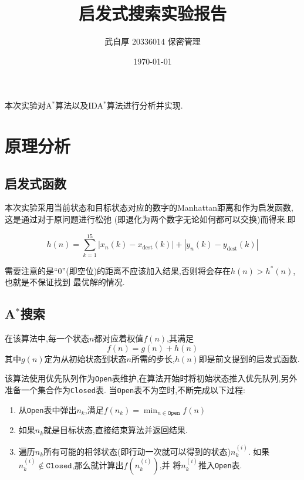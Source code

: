 
\geometry{a4paper}
\title{启发式搜索实验报告}
\author{武自厚 20336014 保密管理}
\date{\today}

\newcommand{\code}[1]{\texttt{#1}}
\newcommand{\true}[0]{\textbf{\emph{true}}}
\newcommand{\false}[0]{\textbf{\emph{false}}}
\newcommand{\img}[3]{\begin{figure}[H]
    \centering
    \texttt{[image: \#2]}
\end{figure}}


    \maketitle
    本次实验对A\(^*\)算法以及IDA\(^*\)算法进行分析并实现.

    \section{原理分析}

    \subsection{启发式函数}
    本次实验采用当前状态和目标状态对应的数字的Manhattan距离和作为启发函数,这是通过对于原问题进行松弛
    (即退化为两个数字无论如何都可以交换)而得来.即

    \[h(n) = \sum_{k=1}^{15} |x_n(k) - x_\text{dest}(k)|+|y_n(k) - y_\text{dest}(k)|\]
    
    需要注意的是``0''(即空位)的距离不应该加入结果,否则将会存在\(h(n) > h^*(n)\),也就是不保证找到
    最优解的情况.

    \subsection{A$^*$搜索}

    在该算法中,每一个状态\(n\)都对应着权值\(f(n)\),其满足
    \[f(n) = g(n) + h(n)\]
    其中\(g(n)\)定为从初始状态到状态\(n\)所需的步长,\(h(n)\)即是前文提到的启发式函数.

    该算法使用优先队列作为\texttt{Open}表维护,在算法开始时将初始状态推入优先队列,另外准备一个集合作为\texttt{Closed}表.
    当\texttt{Open}表不为空时,不断完成以下过程:

    \begin{enumerate}
        \item 从\texttt{Open}表中弹出\(n_k\),满足\(f(n_k) = \min_{n \in \texttt{Open}}f(n)\)
        \item 如果\(n_k\)就是目标状态,直接结束算法并返回结果.
        \item 遍历\(n_k\)所有可能的相邻状态(即行动一次就可以得到的状态)\(n_k^{(i)}\).
        如果\(n_k^{(i)} \notin \texttt{Closed}\),那么就计算出\(f(n_k^{(i)})\),并
        将\(n_k^{(i)}\)推入\texttt{Open}表.
    \end{enumerate}

